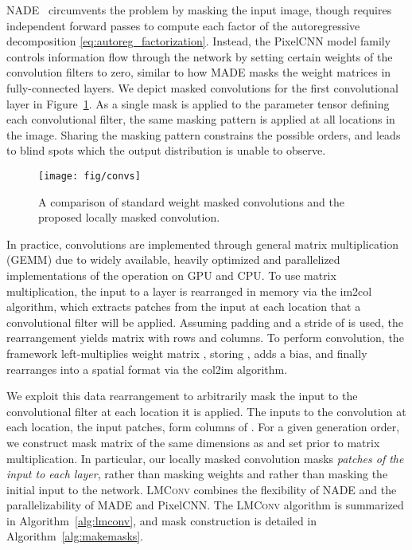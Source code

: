 \documentclass[letterpaper]{article}
\begin{document}
NADE~\citep{larochelle2011neural} circumvents the problem by masking the input image, though requires independent forward passes to compute each factor of the autoregressive decomposition \eqref{eq:autoreg_factorization}. Instead, the PixelCNN model family controls information flow through the network by setting certain weights of the convolution filters to zero, similar to how MADE \citep{germain2015made} masks the weight matrices in fully-connected layers. We depict masked convolutions for the first convolutional layer in Figure~\ref{fig:convs}. As a single mask is applied to the  parameter tensor defining each convolutional filter, the same masking pattern is applied at all locations in the image. Sharing the masking pattern constrains the possible orders, and leads to blind spots which the output distribution is unable to observe.

\begin{figure}
    \centering
    \texttt{[image: fig/convs]}
    \vspace{-8mm}
    \caption{A comparison of standard weight masked convolutions and the proposed locally masked convolution.}
    \label{fig:convs}
    \vspace{-1mm}
\end{figure}

In practice, convolutions are implemented through general matrix multiplication (GEMM) due to widely available, heavily optimized and parallelized implementations of the operation on GPU and CPU. To use matrix multiplication, the input to a layer is rearranged in memory via the im2col algorithm, which extracts  patches from the  input at each location that a convolutional filter will be applied. Assuming padding and a stride of  is used, the rearrangement yields matrix  with  rows and  columns. To perform convolution, the framework left-multiplies weight matrix , storing , adds a bias, and finally rearranges  into a spatial format via the col2im algorithm.

We exploit this data rearrangement to arbitrarily mask the input to the convolutional filter at each location it is applied. The inputs to the convolution at each location, \ie{} the input patches, form columns of . For a given generation order, we construct mask matrix  of the same dimensions as  and set  prior to matrix multiplication. In particular, our locally masked convolution masks \textit{patches of the input to each layer}, rather than masking weights and rather than masking the initial input to the network. \textsc{LMConv} combines the flexibility of NADE and the parallelizability of MADE and PixelCNN. 
The \textsc{LMConv} algorithm is summarized in Algorithm~\ref{alg:lmconv}, and mask construction is detailed in Algorithm~\ref{alg:makemasks}.
\end{document}
